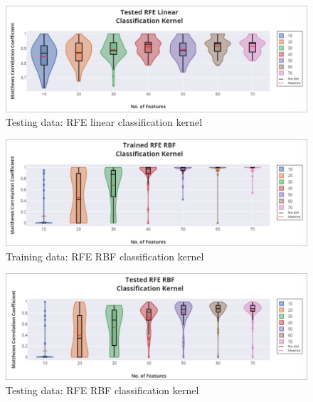 \documentclass[a4paper,twocolumn]{article} %
\begin{document}
		\begin{figure}[h]
		\begin{center}
			\includegraphics[width=500pt]{Tested_RFE_Linear_Classification_Kernel.PNG}
			\caption{Testing data: RFE linear classification kernel}
			\label{fig:Test_RFE_Linear}
		\end{center}
	\end{figure}

		\begin{figure}[h]
		\begin{center}
			\includegraphics[width=500pt]{Trained_RFE_RBF_Classification_Kernel.PNG}
			\caption{Training data: RFE RBF classification kernel}
			\label{fig:Train_RFE_RBF}
		\end{center}
	\end{figure}

		\begin{figure}[h]
		\begin{center}
			\includegraphics[width=500pt]{Tested_RFE_RBF_Classification_Kernel.PNG}
			\caption{Testing data: RFE RBF classification kernel}
			\label{fig:Test_RFE_RBF}
		\end{center}
	\end{figure}
\end{document}
